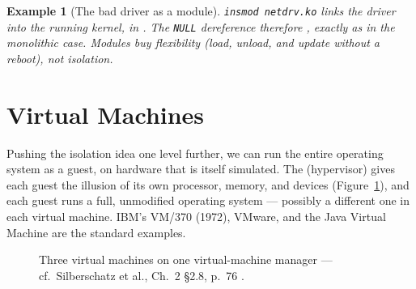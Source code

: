 \documentclass[11pt]{article}
\newtheorem{example}{Example}
\begin{document}
\begin{example}[The bad driver as a module]
\texttt{insmod netdrv.ko} links the driver into the running kernel, in
. The \texttt{NULL} dereference therefore , exactly as in the monolithic case. Modules buy \emph{flexibility}
(load, unload, and update without a reboot), not \emph{isolation}.
\end{example}

\section{Virtual Machines}

\noindent{}

Pushing the isolation idea one level further, we can run the entire operating
system as a guest, on hardware that is itself simulated. The
 (hypervisor) gives each guest the illusion of its
own processor, memory, and devices (Figure~\ref{fig:vm}), and each guest runs a
full, unmodified operating system --- possibly a different one in each virtual
machine. IBM's VM/370 (1972), VMware, and the Java Virtual Machine are the
standard examples.

\begin{figure}[h]
\centering
{}
\caption{Three virtual machines on one virtual-machine manager --- cf.\
Silberschatz et al., Ch.~2 \S2.8, p.~76
\cite{SilberschatzOSC_operating_system_concepts}.}
\label{fig:vm}
\end{figure}
\end{document}
